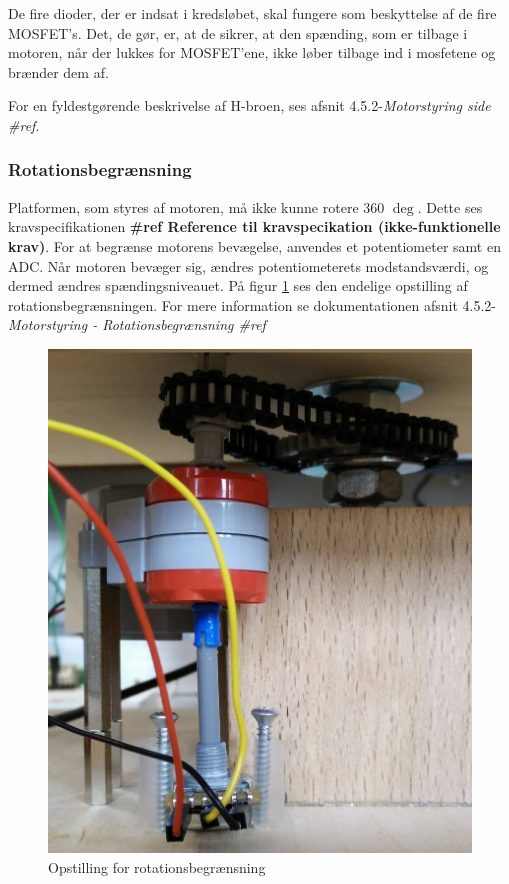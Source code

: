 \noindent De fire dioder, der er indsat i kredsløbet, skal fungere som beskyttelse af de fire MOSFET's. Det, de gør, er, at de sikrer, at den spænding, som er tilbage i motoren, når der lukkes for MOSFET'ene, ikke løber tilbage ind i mosfetene og brænder dem af.\newline 

\noindent For en fyldestgørende beskrivelse af H-broen, ses afsnit 4.5.2-\textit{Motorstyring side \#ref}. 

\subsubsection{Rotationsbegrænsning}
Platformen, som styres af motoren, må ikke kunne rotere 360 \(\deg\). Dette ses kravspecifikationen \textbf{\#ref Reference til kravspecikation (ikke-funktionelle krav)}. For at begrænse motorens bevægelse, anvendes et potentiometer samt en ADC. Når motoren bevæger sig, ændres potentiometerets modstandsværdi, og dermed ændres spændingsniveauet. På figur \ref{fig:opstillingADC} ses den endelige opstilling af rotationsbegrænsningen. For mere information se dokumentationen afsnit 4.5.2-\textit{Motorstyring - Rotationsbegrænsning \#ref}

\begin{figure}[H]
	\centering
	\includegraphics[scale=0.3]{Afsnit/DesignOgImplementering/images/potentiometerADC}
	\caption{Opstilling for rotationsbegrænsning}
	\label{fig:opstillingADC}
\end{figure}


